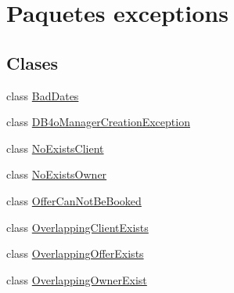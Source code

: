\hypertarget{namespaceexceptions}{}\section{Paquetes exceptions}
\label{namespaceexceptions}
\subsection*{Clases}
\begin{DoxyCompactItemize}
\item 
class \mbox{\hyperlink{classexceptions_1_1_bad_dates}{Bad\+Dates}}
\item 
class \mbox{\hyperlink{classexceptions_1_1_d_b4o_manager_creation_exception}{D\+B4o\+Manager\+Creation\+Exception}}
\item 
class \mbox{\hyperlink{classexceptions_1_1_no_exists_client}{No\+Exists\+Client}}
\item 
class \mbox{\hyperlink{classexceptions_1_1_no_exists_owner}{No\+Exists\+Owner}}
\item 
class \mbox{\hyperlink{classexceptions_1_1_offer_can_not_be_booked}{Offer\+Can\+Not\+Be\+Booked}}
\item 
class \mbox{\hyperlink{classexceptions_1_1_overlapping_client_exists}{Overlapping\+Client\+Exists}}
\item 
class \mbox{\hyperlink{classexceptions_1_1_overlapping_offer_exists}{Overlapping\+Offer\+Exists}}
\item 
class \mbox{\hyperlink{classexceptions_1_1_overlapping_owner_exist}{Overlapping\+Owner\+Exist}}
\end{DoxyCompactItemize}
